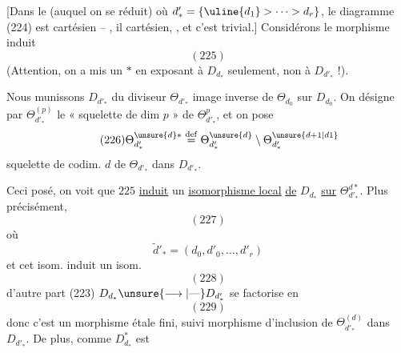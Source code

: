 [Dans le  (auquel on se réduit)
où $d'_* = \{\uline{d_1}>\cdots>d_r\}$, le diagramme
(224) est cartésien -- , il
  cartésien, , et c'est trivial.]
Considérons le morphisme induit
\[
(225)
\]
(Attention, on a mis un $*$ en exposant
à $D_{d_*}$ seulement, non à $D_{d'_*}$ !).

Nous munissons $D_{d'_*}$ du diviseur
$\Theta_{d'_*}$ image inverse de $\Theta_{d_0}$ sur $D_{d_0}$.
On désigne par $\Theta_{d'_*}^{(p)}$ le « squelette
de dim $p$ » de $\Theta_{d'_*}^{p}$, et  on pose
\[
\tag{226}
\Theta_{d'_*}^{\unsure{d}*}\overset{\mathrm{def}}=
\Theta_{d'_*}^{\unsure{d}}\setminus\Theta_{d'_*}^{\unsure{d+1|d1}}
\]
squelette 
de codim. $d$ de
$\Theta_{d'_*}$ dans $D_{d'_*}$.

Ceci posé, on voit que $225$ \uline{induit}
un  \uline{isomorphisme local}
\uline{de} $D_{d_*}$ \uline{sur}  $\Theta_{d'_*}^{d*}$. Plus
précisément, 
\[
(227)
\]
où 
\[
\widetilde d'_*=(d_0,d'_0,\ldots,d'_r)
\]
et cet isom. induit un isom.
\[
(228)
\]
d'autre part (223) $D_{d_*}\unsure{\longrightarrow|\text{---}}D_{d'_*}$ se
factorise en
\[
(229)
\]
donc c'est un morphisme étale fini,
suivi  morphisme d'inclusion de
$\Theta_{d'_*}^{(d)}$ dans $D_{d'_*}$. De plus, comme $D_{d_*}^{*}$ est
